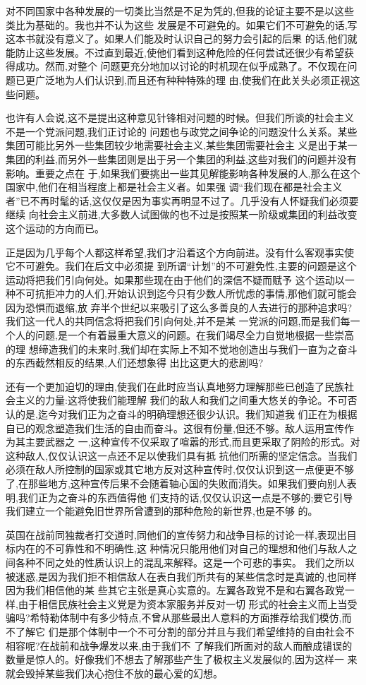 ﻿\documentclass[12pt]{article}
\begin{document}
对不同国家中各种发展的一切类比当然是不足为凭的,但我的论证主要不是以这些类比为基础的。我也并不认为这些
发展是不可避免的。如果它们不可避免的话,写这本书就没有意义了。如果人们能及时认识自己的努力会引起的后果
的话,他们就能防止这些发展。不过直到最近,使他们看到这种危险的任何尝试还很少有希望获得成功。然而,对整个
问题更充分地加以讨论的时机现在似乎成熟了。不仅现在问题已更广泛地为人们认识到,而且还有种种特殊的理
由,使我们在此关头必须正视这些问题。

也许有人会说,这不是提出这种意见针锋相对问题的时候。但我们所谈的社会主义不是一个党派问题,我们正讨论的
问题也与政党之间争论的问题没什么关系。某些集团可能比另外一些集团较少地需要社会主义,某些集团需要社会主
义是出于某一集团的利益,而另外一些集团则是出于另一个集团的利益,这些对我们的问题并没有影响。重要之点在
于,如果我们要挑出一些其见解能影响各种发展的人,那么在这个国家中,他们在相当程度上都是社会主义者。如果强
调``我们现在都是社会主义者''已不再时髦的话,这仅仅是因为事实再明显不过了。几乎没有人怀疑我们必须要继续
向社会主义前进,大多数人试图做的也不过是按照某一阶级或集团的利益改变这个运动的方向而已。

正是因为几乎每个人都这样希望,我们才沿着这个方向前进。没有什么客观事实使它不可避免。我们在后文中必须提
到所谓``计划''的不可避免性,主要的问题是这个运动将把我们引向何处。如果那些现在由于他们的深信不疑而赋予
这个运动以一种不可抗拒冲力的人们,开始认识到迄今只有少数人所忧虑的事情,那他们就可能会因为恐惧而退缩,放
弃半个世纪以来吸引了这么多善良的人去进行的那种追求吗?我们这一代人的共同信念将把我们引向何处,并不是某
一党派的问题,而是我们每一个人的问题,是一个有着最重大意义的问题。在我们竭尽全力自觉地根据一些崇高的理
想缔造我们的未来时,我们却在实际上不知不觉地创造出与我们一直为之奋斗的东西截然相反的结果,人们还想象得
出比这更大的悲剧吗?

还有一个更加迫切的理由,使我们在此时应当认真地努力理解那些已创造了民族社会主义的力量:这将使我们能理解
我们的敌人和我们之间重大悠关的争论。不可否认的是,迄今对我们正为之奋斗的明确理想还很少认识。我们知道我
们正在为根据自已的观念塑造我们生活的自由而奋斗。这很有份量,但还不够。敌人运用宣传作为其主要武器之
一,这种宣传不仅采取了喧嚣的形式,而且更采取了阴险的形式。对这种敌人,仅仅认识这一点还不足以使我们具有抵
抗他们所需的坚定信念。当我们必须在敌人所控制的国家或其它地方反对这种宣传时,仅仅认识到这一点便更不够
了,在那些地方,这种宣传后果不会随着轴心国的失败而消失。如果我们要向别人表明,我们正为之奋斗的东西值得他
们支持的话,仅仅认识这一点是不够的;要它引导我们建立一个能避免旧世界所曾遭到的那种危险的新世界,也是不够
的。

英国在战前同独裁者打交道时,同他们的宣传努力和战争目标的讨论一样,表现出目标内在的不可靠性和不明确性,这
种情况只能用他们对自己的理想和他们与敌人之间各种不同之处的性质认识上的混乱来解释。这是一个可悲的事实。
我们之所以被迷惑,是因为我们拒不相信敌人在表白我们所共有的某些信念时是真诚的,也同样因为我们相信他的某
些其它主张是真心实意的。左翼各政党不是和右翼各政党一样,由于相信民族社会主义党是为资本家服务并反对一切
形式的社会主义而上当受骗吗?希特勒体制中有多少特点,不曾从那些最出人意料的方面推荐给我们模仿,而不了解它
们是那个体制中一个不可分割的部分并且与我们希望维持的自由社会不相容呢?在战前和战争爆发以来,由于我们不
了解我们所面对的敌人而酿成错误的数量是惊人的。好像我们不想去了解那些产生了极权主义发展似的,因为这样一
来就会毁掉某些我们决心抱住不放的最心爱的幻想。
\end{document}
